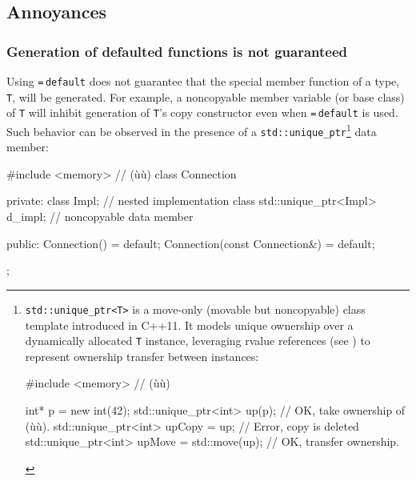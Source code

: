 \subsection{Annoyances}

\subsubsection[Generation of defaulted functions is not guaranteed]{Generation of defaulted functions is not guaranteed}\label{generation-of-defaulted-functions-is-not-guaranteed}

Using \lstinline!=!\,\lstinline!default! does not guarantee that the special
member function of a type, \lstinline!T!, will be generated. For example, a
noncopyable member variable (or base class) of \lstinline!T! will inhibit
generation of \lstinline!T!'s copy constructor even when
\lstinline!=!\,\lstinline!default! is used. Such behavior can be observed in
the presence of a \lstinline!std::unique_ptr!{\cprotect\footnote{\lstinline!std::unique_ptr<T>!
is a move-only (movable but noncopyable) class template introduced in
C++11. It models unique ownership over a dynamically allocated
  \lstinline!T! instance, leveraging rvalue references (see )
  to represent ownership transfer between instances:

  \begin{emcppshiddenlisting}[emcppsbatch=e5]
  #include <memory>  // (ù{}ù)
  \end{emcppshiddenlisting}
  \begin{emcppslisting}[emcppsbatch=e5,basicstyle={\ttfamily\footnotesize}]
  int* p = new int(42);
  std::unique_ptr<int> up(p);                   // OK, take ownership of (ù{}ù).
  std::unique_ptr<int> upCopy = up;             // Error, copy is deleted
  std::unique_ptr<int> upMove = std::move(up);  // OK, transfer ownership.
  \end{emcppslisting}
      }} data member:

\begin{emcppslisting}
#include <memory>  // (ù{}ù)
class Connection
{
private:
    class Impl;                    // nested implementation class
    std::unique_ptr<Impl> d_impl;  // noncopyable data member

public:
    Connection() = default;
    Connection(const Connection&) = default;
};
\end{emcppslisting}

